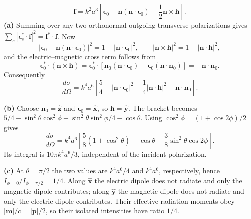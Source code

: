 \[
\mathbf f=k^2a^3\left[
\boldsymbol\epsilon_0-\mathbf n(\mathbf n\cdot\boldsymbol\epsilon_0)
+\frac12\mathbf n\times\mathbf h\right].
\]
\textbf{(a)} Summing over any two orthonormal outgoing transverse
polarizations gives $\sum_s|\boldsymbol\epsilon_s^*\cdot\mathbf f|^2
=\mathbf f^*\cdot\mathbf f$. Now
\[
|\boldsymbol\epsilon_0-\mathbf n(\mathbf n\cdot\boldsymbol\epsilon_0)|^2
=1-|\mathbf n\cdot\boldsymbol\epsilon_0|^2,\qquad
|\mathbf n\times\mathbf h|^2=1-|\mathbf n\cdot\mathbf h|^2,
\]
and the electric--magnetic cross term follows from
\[
\boldsymbol\epsilon_0^*\cdot(\mathbf n\times\mathbf h)
=\boldsymbol\epsilon_0^*\cdot
[\mathbf n_0(\mathbf n\cdot\boldsymbol\epsilon_0)
-\boldsymbol\epsilon_0(\mathbf n\cdot\mathbf n_0)]
=-\mathbf n\cdot\mathbf n_0.
\]
Consequently
\[
\boxed{\frac{d\sigma}{d\Omega}=k^4a^6
\left[\frac54-|\mathbf n\cdot\boldsymbol\epsilon_0|^2
-\frac14|\mathbf n\cdot\mathbf h|^2-\mathbf n\cdot\mathbf n_0\right].}
\]

\textbf{(b)} Choose $\mathbf n_0=\widehat{\mathbf z}$ and
$\boldsymbol\epsilon_0=\widehat{\mathbf x}$, so $\mathbf h=\widehat{\mathbf y}$.
The bracket becomes
$5/4-\sin^2\theta\cos^2\phi-\sin^2\theta\sin^2\phi/4-\cos\theta$.
Using $\cos^2\phi=(1+\cos2\phi)/2$ gives
\[
\frac{d\sigma}{d\Omega}=k^4a^6
\left[\frac58(1+\cos^2\theta)-\cos\theta
-\frac38\sin^2\theta\cos2\phi\right].
\]
Its integral is $10\pi k^4a^6/3$, independent of the incident polarization.

\textbf{(c)} At $\theta=\pi/2$ the two values are $k^4a^6/4$ and
$k^4a^6$, respectively, hence $I_{\phi=0}/I_{\phi=\pi/2}=1/4$.
Along $\widehat{\mathbf x}$ the electric dipole does not radiate and only
the magnetic dipole contributes; along $\widehat{\mathbf y}$ the magnetic
dipole does not radiate and only the electric dipole contributes.
Their effective radiation moments obey $|\mathbf m|/c=|\mathbf p|/2$,
so their isolated intensities have ratio $1/4$.

